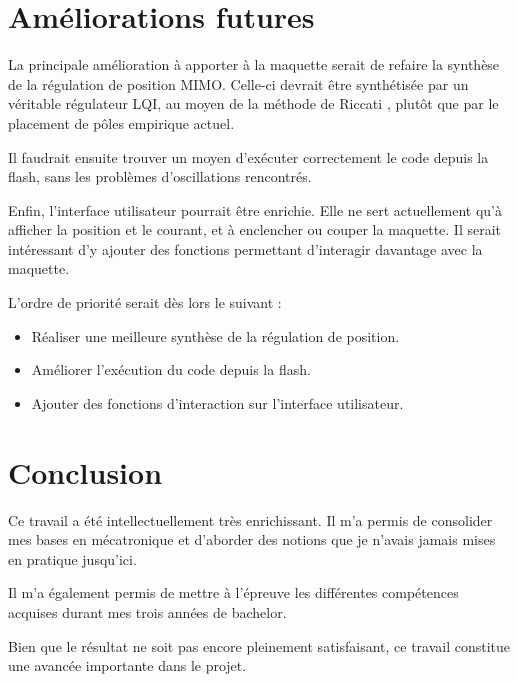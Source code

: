 \section{Améliorations futures}
La principale amélioration à apporter à la maquette serait de refaire la synthèse de la régulation de position MIMO. Celle-ci devrait être synthétisée par un véritable régulateur LQI, au moyen de la méthode de Riccati \cite{Riccati}, plutôt que par le placement de pôles empirique actuel.

Il faudrait ensuite trouver un moyen d'exécuter correctement le code depuis la flash, sans les problèmes d'oscillations rencontrés.

Enfin, l'interface utilisateur pourrait être enrichie. Elle ne sert actuellement qu'à afficher la position et le courant, et à enclencher ou couper la maquette. Il serait intéressant d'y ajouter des fonctions permettant d'interagir davantage avec la maquette.

L'ordre de priorité serait dès lors le suivant :

\begin{itemize}
    \item Réaliser une meilleure synthèse de la régulation de position.
    \item Améliorer l'exécution du code depuis la flash.
    \item Ajouter des fonctions d'interaction sur l'interface utilisateur.
\end{itemize}

\section{Conclusion}
Ce travail a été intellectuellement très enrichissant. Il m'a permis de consolider mes bases en mécatronique et d'aborder des notions que je n'avais jamais mises en pratique jusqu'ici.

Il m'a également permis de mettre à l'épreuve les différentes compétences acquises durant mes trois années de bachelor.

Bien que le résultat ne soit pas encore pleinement satisfaisant, ce travail constitue une avancée importante dans le projet.

\vfil
\hspace{8cm}\makeatletter\@author\makeatother\par
\hspace{8cm}\begin{minipage}{5cm}
    \printsignature
\end{minipage}